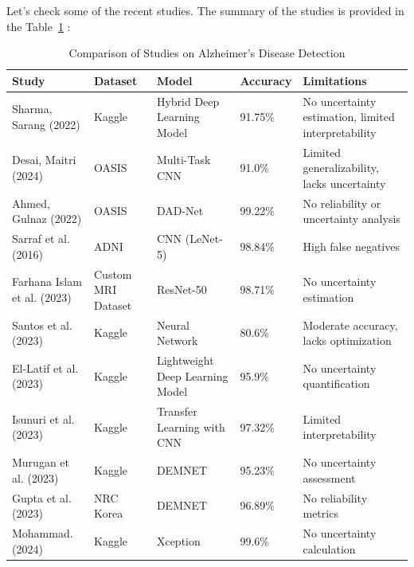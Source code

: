 \documentclass[12pt,onecolumn]{report}
\begin{document}
Let's check some of the recent studies. The summary of the studies is provided in the Table~\ref{tab:methods_comparison} :
\begin{table}[h!]
    \centering
    \caption{Comparison of Studies on Alzheimer’s Disease Detection}
    \label{tab:methods_comparison}
    \begin{tabular}{|p{3cm}|p{3cm}|p{3cm}|p{2cm}|p{4cm}|}
        \hline
        \textbf{Study} & \textbf{Dataset} & \textbf{Model} & \textbf{Accuracy} & \textbf{Limitations} \\ \hline
        Sharma, Sarang (2022) \cite{2022Sarang} & Kaggle & Hybrid Deep Learning Model & 91.75\% & No uncertainty estimation, limited interpretability \\ \hline
        Desai, Maitri (2024) \cite{2024Desai} & OASIS & Multi-Task CNN & 91.0\% & Limited generalizability, lacks uncertainty \\ \hline
        Ahmed, Gulnaz (2022) \cite{2022Ahmed} & OASIS & DAD-Net & 99.22\% & No reliability or uncertainty analysis \\ \hline
        Sarraf et al. (2016) \cite{sarraf2016} & ADNI & CNN (LeNet-5) & 98.84\% & High false negatives \\ \hline
        Farhana Islam et al. (2023) \cite{Islam2023} & Custom MRI Dataset & ResNet-50 & 98.71\% & No uncertainty estimation \\ \hline
        Santos et al. (2023)  \cite{Santos2023} & Kaggle & Neural Network & 80.6\% & Moderate accuracy, lacks optimization \\ \hline
        El-Latif et al. (2023) \cite{Latif2023} & Kaggle & Lightweight Deep Learning Model & 95.9\% & No uncertainty quantification \\ \hline
        Isunuri et al. (2023) \cite{Isunuri2023} & Kaggle & Transfer Learning with CNN & 97.32\% & Limited interpretability \\ \hline
        Murugan et al. (2023) \cite{Murugan2021} & Kaggle & DEMNET & 95.23\% & No uncertainty assessment \\ \hline
        Gupta et al. (2023) \cite{Gupta2019} & NRC Korea & DEMNET & 96.89\% & No reliability metrics \\ \hline
        Mohammad. (2024) \cite{gobara_kaggle_notebook2024} & Kaggle & Xception & 99.6\% & No uncertainty calculation \\ \hline
    \end{tabular}
\end{table}
\end{document}
